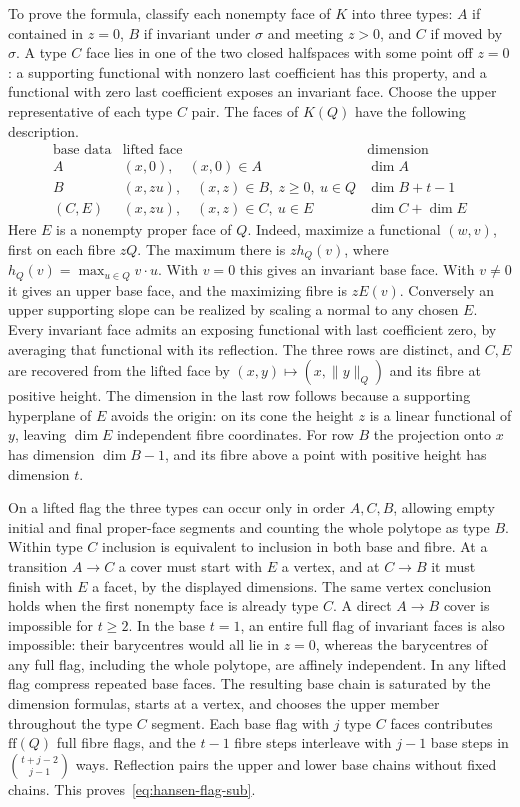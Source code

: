 \documentclass[11pt,a4paper]{article}
\numberwithin{equation}{section}
\begin{document}
To prove the formula, classify each nonempty face of $K$ into three types: $A$ if contained in $z=0$, $B$ if invariant under $\sigma$ and meeting $z>0$, and $C$ if moved by $\sigma$. A type $C$ face lies in one of the two closed halfspaces with some point off $z=0$: a supporting functional with nonzero last coefficient has this property, and a functional with zero last coefficient exposes an invariant face. Choose the upper representative of each type $C$ pair. The faces of $K(Q)$ have the following description.
\[
\begin{array}{c|l|c}
\text{base data}&\text{lifted face}&\text{dimension}\\\hline
 A &(x,0),\quad(x,0)\in A &\dim A\\
 B &(x,zu),\quad (x,z)\in B,\ z\ge0,\ u\in Q &\dim B+t-1\\
 (C,E)&(x,zu),\quad (x,z)\in C,\ u\in E &\dim C+\dim E
\end{array}
\]
Here $E$ is a nonempty proper face of $Q$. Indeed, maximize a functional $(w,v)$, first on each fibre $zQ$. The maximum there is $zh_Q(v)$, where $h_Q(v)=\max_{u\in Q} v\cdot u$. With $v=0$ this gives an invariant base face. With $v\ne0$ it gives an upper base face, and the maximizing fibre is $zE(v)$. Conversely an upper supporting slope can be realized by scaling a normal to any chosen $E$. Every invariant face admits an exposing functional with last coefficient zero, by averaging that functional with its reflection. The three rows are distinct, and $C,E$ are recovered from the lifted face by $(x,y)\mapsto(x,\|y\|_Q)$ and its fibre at positive height. The dimension in the last row follows because a supporting hyperplane of $E$ avoids the origin: on its cone the height $z$ is a linear functional of $y$, leaving $\dim E$ independent fibre coordinates. For row $B$ the projection onto $x$ has dimension $\dim B-1$, and its fibre above a point with positive height has dimension $t$.

On a lifted flag the three types can occur only in order $A,C,B$, allowing empty initial and final proper-face segments and counting the whole polytope as type $B$. Within type $C$ inclusion is equivalent to inclusion in both base and fibre. At a transition $A\to C$ a cover must start with $E$ a vertex, and at $C\to B$ it must finish with $E$ a facet, by the displayed dimensions. The same vertex conclusion holds when the first nonempty face is already type $C$. A direct $A\to B$ cover is impossible for $t\ge2$. In the base $t=1$, an entire full flag of invariant faces is also impossible: their barycentres would all lie in $z=0$, whereas the barycentres of any full flag, including the whole polytope, are affinely independent. In any lifted flag compress repeated base faces. The resulting base chain is saturated by the dimension formulas, starts at a vertex, and chooses the upper member throughout the type $C$ segment. Each base flag with $j$ type $C$ faces contributes $\mathrm{ff}(Q)$ full fibre flags, and the $t-1$ fibre steps interleave with $j-1$ base steps in $\binom{t+j-2}{j-1}$ ways. Reflection pairs the upper and lower base chains without fixed chains. This proves~\eqref{eq:hansen-flag-sub}.
\end{document}
